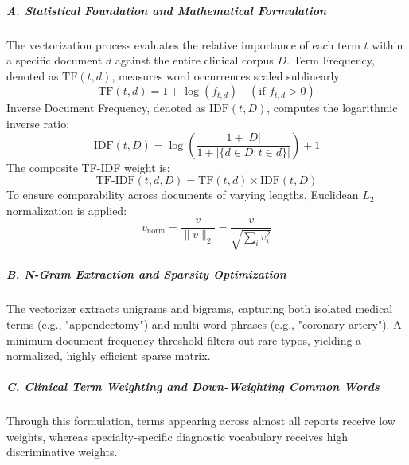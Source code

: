 \subparagraph{A. Statistical Foundation and Mathematical Formulation}
The vectorization process evaluates the relative importance of each term $t$ within a specific document $d$ against the entire clinical corpus $D$. Term Frequency, denoted as $\text{TF}(t, d)$, measures word occurrences scaled sublinearly:
\begin{equation}
\text{TF}(t, d) = 1 + \log(f_{t, d}) \quad (\text{if } f_{t, d} > 0)
\end{equation}
Inverse Document Frequency, denoted as $\text{IDF}(t, D)$, computes the logarithmic inverse ratio:
\begin{equation}
\text{IDF}(t, D) = \log\left(\frac{1 + |D|}{1 + |\{d \in D : t \in d\}|}\right) + 1
\end{equation}
The composite TF-IDF weight is:
\begin{equation}
\text{TF-IDF}(t, d, D) = \text{TF}(t, d) \times \text{IDF}(t, D)
\end{equation}
To ensure comparability across documents of varying lengths, Euclidean $L_2$ normalization is applied:
\begin{equation}
v_{\text{norm}} = \frac{v}{\|v\|_2} = \frac{v}{\sqrt{\sum_i v_i^2}}
\end{equation}

\subparagraph{B. N-Gram Extraction and Sparsity Optimization}
The vectorizer extracts unigrams and bigrams, capturing both isolated medical terms (e.g., "appendectomy") and multi-word phrases (e.g., "coronary artery"). A minimum document frequency threshold filters out rare typos, yielding a normalized, highly efficient sparse matrix.

\subparagraph{C. Clinical Term Weighting and Down-Weighting Common Words}
Through this formulation, terms appearing across almost all reports receive low weights, whereas specialty-specific diagnostic vocabulary receives high discriminative weights.

